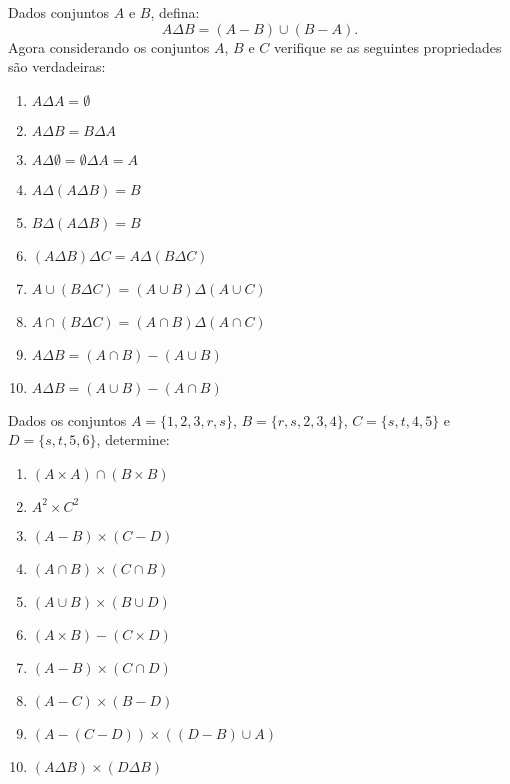 \documentclass[12pt]{exam}
\begin{document}
\questao{} Dados conjuntos $A$ e $B$, defina:
\[
	A \Delta B = (A - B) \cup (B - A).
\]
Agora considerando os conjuntos $A$, $B$ e $C$ verifique se as seguintes propriedades s\~ao verdadeiras:
\begin{multicols}{2}
	\begin{enumerate}[label={\alph*})]
	\item $A \Delta A = \emptyset$
	\item $A \Delta B = B \Delta A$
	\item $A \Delta \emptyset = \emptyset \Delta A = A$
	\item $A \Delta (A \Delta B) = B$
	\item $B \Delta (A \Delta B) = B$
	\item $(A \Delta B) \Delta C = A \Delta (B \Delta C)$
	\item $A \cup (B \Delta C) = (A \cup B) \Delta (A \cup C)$
	\item $A \cap (B \Delta C) = (A \cap B) \Delta (A \cap C)$
	\item $A \Delta B = (A \cap B) - (A \cup B)$
	\item $A \Delta B = (A \cup B) - (A \cap B)$
\end{enumerate}
\end{multicols}

\questao{} Dados os conjuntos $A = \{1, 2, 3, r, s\}$, $B = \{r, s, 2, 3, 4\}$, $C = \{s, t, 4, 5\}$ e $D = \{s, t, 5, 6\}$, determine:
\begin{multicols}{2}
	\begin{enumerate}[label={\alph*})]
		\item $(A \times A) \cap (B \times B)$
		\item $A^2 \times C^2$
		\item $(A - B) \times (C - D)$
		\item $(A \cap B) \times (C \cap B)$
		\item $(A \cup B) \times (B \cup D)$
		\item $(A \times B) - (C \times D)$
		\item $(A - B) \times (C \cap D)$
		\item $(A - C) \times (B - D)$
		\item $(A - (C - D)) \times ((D - B) \cup A)$
		\item $(A \Delta B) \times (D \Delta B)$
	\end{enumerate}
	
\end{multicols}
\end{document}
